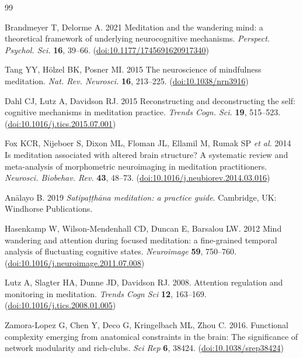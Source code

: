 \documentclass[openacc]{rsproca_new}%
\begin{document}
\begin{thebibliography}{99}

Brandmeyer T, Delorme A. 2021 Meditation and the wandering mind: a theoretical framework of underlying neurocognitive mechanisms. \textit{Perspect. Psychol. Sci.} \textbf{16}, 39--66. (\href{https://doi.org/10.1177/1745691620917340}{doi:10.1177/1745691620917340})

Tang YY, H\"olzel BK, Posner MI. 2015 The neuroscience of mindfulness meditation. \textit{Nat. Rev. Neurosci.} \textbf{16}, 213--225. (\href{https://doi.org/10.1038/nrn3916}{doi:10.1038/nrn3916})

Dahl CJ, Lutz A, Davidson RJ. 2015 Reconstructing and deconstructing the self: cognitive mechanisms in meditation practice. \textit{Trends Cogn. Sci.} \textbf{19}, 515--523. (\href{https://doi.org/10.1016/j.tics.2015.07.001}{doi:10.1016/j.tics.2015.07.001})

Fox KCR, Nijeboer S, Dixon ML, Floman JL, Ellamil M, Rumak SP \textit{et al.} 2014 Is meditation associated with altered brain structure? A systematic review and meta-analysis of morphometric neuroimaging in meditation practitioners. \textit{Neurosci. Biobehav. Rev.} \textbf{43}, 48--73. (\href{https://doi.org/10.1016/j.neubiorev.2014.03.016}{doi:10.1016/j.neubiorev.2014.03.016})

An\=alayo B. 2019 \textit{Satipa\d{t}\d{t}h\=ana meditation: a practice guide}. Cambridge, UK: Windhorse Publications.

Hasenkamp W, Wilson-Mendenhall CD, Duncan E, Barsalou LW. 2012 Mind wandering and attention during focused meditation: a fine-grained temporal analysis of fluctuating cognitive states. \textit{Neuroimage} \textbf{59}, 750--760. (\href{https://doi.org/10.1016/j.neuroimage.2011.07.008}{doi:10.1016/j.neuroimage.2011.07.008})

Lutz A, Slagter HA, Dunne JD, Davidson RJ. 2008. Attention regulation and monitoring in meditation. \textit{Trends Cogn Sci} \textbf{12}, 163--169. (\href{https://doi.org/10.1016/j.tics.2008.01.005}{doi:10.1016/j.tics.2008.01.005})

Zamora-Lopez G, Chen Y, Deco G, Kringelbach ML, Zhou C. 2016. Functional complexity emerging from anatomical constraints in the brain: The significance of network modularity and rich-clubs. \textit{Sci Rep} \textbf{6}, 38424. (\href{https://doi.org/10.1038/srep38424}{doi:10.1038/srep38424})


\end{thebibliography}
\end{document}
